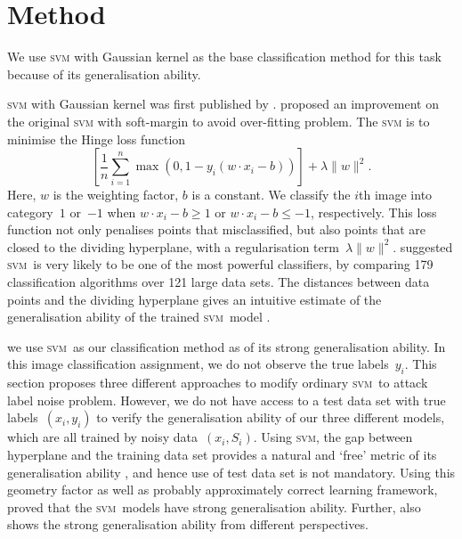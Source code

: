 \documentclass{article} %
\newcommand{\svm}{\textsc{svm}}
\begin{document}
\section{Method}\label{method}
We use \textsc{svm} with Gaussian kernel as the base classification method for this task because of its generalisation ability.

\textsc{svm} with Gaussian kernel was first published by \citet{Boser:1992:TAO:130385.130401}. \citet{Cortes1995} proposed an improvement on the original \textsc{svm} with soft-margin  to  avoid over-fitting problem. The \textsc{svm} is to minimise the Hinge loss function
\begin{equation*}
\left[{\frac {1}{n}}\sum _{i=1}^{n}\max \left(0,1-y_{i}(w\cdot x_{i}-b)\right)\right]+\lambda \lVert w\rVert ^{2}.   
\end{equation*}
Here, $w$ is the weighting factor, $b$ is a constant. We classify the $i$th image into category~$1$ or~$-1$ when $w\cdot x_{i}-b\geq1$ or $w\cdot x_{i}-b\leq-1$, respectively. This loss function not only penalises points that misclassified, but also points that are closed to the dividing hyperplane, with a regularisation term~$\lambda \lVert w\rVert ^{2}$. \citet{Fernandez-Delgado:2014:WNH:2627435.2697065} suggested \svm\ is very likely to be one of the most powerful classifiers, by comparing 179 classification algorithms over 121 large data sets. The distances between data points and the dividing hyperplane gives an intuitive estimate of the generalisation ability of the trained \svm\ model \citep{hastie01statisticallearning}. 

we use \svm\ as our classification method as of its strong generalisation ability. In this image classification assignment, we do not observe the true labels~$y_i$. This section proposes three different approaches to modify ordinary \svm\ to attack label noise problem. However, we do not have access to a test data set with true labels~$(x_i,y_i)$ to verify the generalisation ability of our three different models, which are all trained by noisy data~$(x_i,S_i)$. Using \svm , the gap between hyperplane and the training data set provides a natural and `free' metric of its generalisation ability  \citep{hastie01statisticallearning}, and hence use of test data set is not mandatory. Using this geometry factor as well as probably approximately correct learning framework,  \citet{NIPS2012_4500} proved that the  \svm\ models have strong generalisation ability. Further,  \citep{Cortes1995,Seeger:2003:PGE:944919.944929} also shows the strong generalisation ability from different perspectives.
\end{document}
